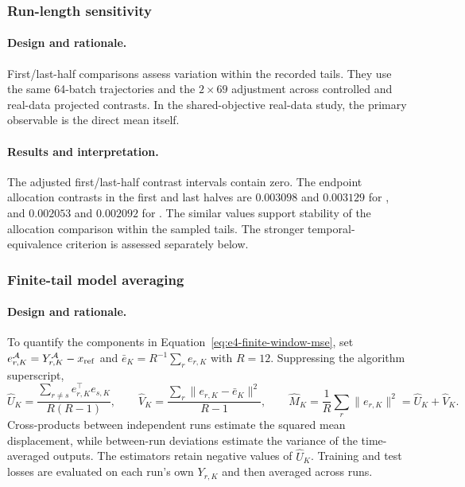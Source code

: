 \subsubsection{Run-length sensitivity}
\label{app:supp-audit}

\paragraph{Design and rationale.}
First/last-half comparisons assess variation within the recorded tails.
They use the same 64-batch trajectories and the $2\times69$ adjustment
across controlled and real-data projected contrasts. In the shared-objective
real-data study, the primary observable is the direct mean itself.

\paragraph{Results and interpretation.}
The adjusted first/last-half contrast intervals contain zero. The endpoint
allocation contrasts in the first and last halves are $0.003098$ and
$0.003129$ for \Scaf{}, and $0.002053$ and $0.002092$ for \FedAvg{}.
The similar values support stability of the allocation comparison within
the sampled tails. The stronger temporal-equivalence criterion is assessed
separately below.

\subsubsection{Finite-tail model averaging}
\label{app:e4-averaging}

\paragraph{Design and rationale.}
To quantify the components in Equation~\eqref{eq:e4-finite-window-mse},
set $e_{r,K}^{\mathcal A}=Y_{r,K}^{\mathcal A}-x_{\rm ref}$ and
$\bar e_K=R^{-1}\sum_r e_{r,K}$ with $R=12$.
Suppressing the algorithm superscript,
\begin{equation}
\label{eq:e4-estimators}
\widehat U_K=\frac{\sum_{r\ne s}e_{r,K}^{\top}e_{s,K}}{R(R-1)},\qquad
\widehat V_K=\frac{\sum_r\|e_{r,K}-\bar e_K\|^2}{R-1},\qquad
\widehat M_K=\frac1R\sum_r\|e_{r,K}\|^2=\widehat U_K+\widehat V_K.
\end{equation}
Cross-products between independent runs estimate the squared mean
displacement, while between-run deviations estimate the variance of the
time-averaged outputs. The estimators retain negative values of
$\widehat U_K$. Training and test losses are evaluated on each run's own
$Y_{r,K}$ and then averaged across runs.

